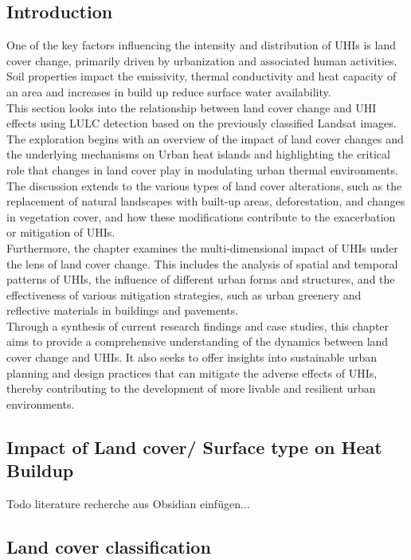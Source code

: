 \documentclass[12pt,a4paper, english,twoside]{article}
\begin{document}
    \subsection{Introduction}
    One of the key factors influencing the intensity and distribution of UHIs is land cover change, primarily driven by urbanization and associated human activities.
    Soil properties impact the emissivity, thermal conductivity and heat capacity of an area and increases in build up reduce surface water availability. 
\\    
This section looks into the relationship between land cover change and UHI effects using LULC detection based on the previously classified Landsat images.
The exploration begins with an overview of the impact of land cover changes and the underlying mechanisms on Urban heat islands and highlighting the critical role that changes in land cover play in modulating urban thermal environments.
The discussion extends to the various types of land cover alterations, such as the replacement of natural landscapes with built-up areas, deforestation, and changes in vegetation cover, and how these modifications contribute to the exacerbation or mitigation of UHIs.
\\
Furthermore, the chapter examines the multi-dimensional impact of UHIs under the lens of land cover change.
This includes the analysis of spatial and temporal patterns of UHIs, the influence of different urban forms and structures, and the effectiveness of various mitigation strategies, such as urban greenery and reflective materials in buildings and pavements.
\\
Through a synthesis of current research findings and case studies, this chapter aims to provide a comprehensive understanding of the dynamics between land cover change and UHIs.
It also seeks to offer insights into sustainable urban planning and design practices that can mitigate the adverse effects of UHIs, thereby contributing to the development of more livable and resilient urban environments.
%
    \subsection{Impact of Land cover/ Surface type on Heat Buildup}
    Todo literature recherche aus Obsidian einfügen... 
    \subsection{Land cover classification}
\end{document}
